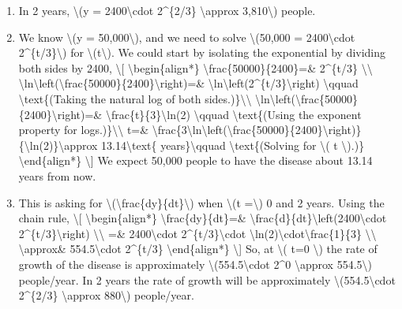 \begin{enumerate}
\tightlist
\item
  In 2 years, \textbackslash{}(y = 2400\textbackslash{}cdot 2\^{}\{2/3\}
  \textbackslash{}approx 3,810\textbackslash{}) people.
\item
  We know \textbackslash{}(y = 50,000\textbackslash{}), and we need to
  solve \textbackslash{}(50,000 = 2400\textbackslash{}cdot
  2\^{}\{t/3\}\textbackslash{}) for \textbackslash{}(t\textbackslash{}).
  We could start by isolating the exponential by dividing both sides by
  2400, \textbackslash{}{[} \textbackslash{}begin\{align*\}
  \textbackslash{}frac\{50000\}\{2400\}=\& 2\^{}\{t/3\}
  \textbackslash{}\textbackslash{}
  \textbackslash{}ln\textbackslash{}left(\textbackslash{}frac\{50000\}\{2400\}\textbackslash{}right)=\&
  \textbackslash{}ln\textbackslash{}left(2\^{}\{t/3\}\textbackslash{}right)
  \textbackslash{}qquad \textbackslash{}text\{(Taking the natural log of
  both sides.)\}\textbackslash{}\textbackslash{}
  \textbackslash{}ln\textbackslash{}left(\textbackslash{}frac\{50000\}\{2400\}\textbackslash{}right)=\&
  \textbackslash{}frac\{t\}\{3\}\textbackslash{}ln(2)
  \textbackslash{}qquad \textbackslash{}text\{(Using the exponent
  property for logs.)\}\textbackslash{}\textbackslash{} t=\&
  \textbackslash{}frac\{3\textbackslash{}ln\textbackslash{}left(\textbackslash{}frac\{50000\}\{2400\}\textbackslash{}right)\}\{\textbackslash{}ln(2)\}\textbackslash{}approx
  13.14\textbackslash{}text\{ years\}\textbackslash{}qquad
  \textbackslash{}text\{(Solving for \textbackslash{}( t
  \textbackslash{}).)\} \textbackslash{}end\{align*\}
  \textbackslash{}{]} We expect 50,000 people to have the disease about
  13.14 years from now.
\item
  This is asking for
  \textbackslash{}(\textbackslash{}frac\{dy\}\{dt\}\textbackslash{})
  when \textbackslash{}(t =\textbackslash{}) 0 and 2 years. Using the
  chain rule, \textbackslash{}{[} \textbackslash{}begin\{align*\}
  \textbackslash{}frac\{dy\}\{dt\}=\&
  \textbackslash{}frac\{d\}\{dt\}\textbackslash{}left(2400\textbackslash{}cdot
  2\^{}\{t/3\}\textbackslash{}right) \textbackslash{}\textbackslash{}
  =\& 2400\textbackslash{}cdot 2\^{}\{t/3\}\textbackslash{}cdot
  \textbackslash{}ln(2)\textbackslash{}cdot\textbackslash{}frac\{1\}\{3\}
  \textbackslash{}\textbackslash{} \textbackslash{}approx\&
  554.5\textbackslash{}cdot 2\^{}\{t/3\} \textbackslash{}end\{align*\}
  \textbackslash{}{]} So, at \textbackslash{}( t=0 \textbackslash{}) the
  rate of growth of the disease is approximately
  \textbackslash{}(554.5\textbackslash{}cdot 2\^{}0
  \textbackslash{}approx 554.5\textbackslash{}) people/year. In 2 years
  the rate of growth will be approximately
  \textbackslash{}(554.5\textbackslash{}cdot 2\^{}\{2/3\}
  \textbackslash{}approx 880\textbackslash{}) people/year.
\end{enumerate}

